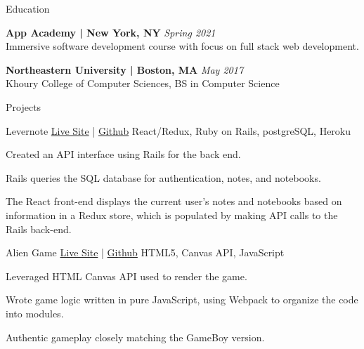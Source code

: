 \documentclass{resume}
\begin{document}
\begin{rSection}{Education}

    {\bf App Academy | New York, NY} \hfill{\em Spring 2021}
    \\ Immersive software development course with focus on full stack web development.

        {\bf Northeastern University | Boston, MA} \hfill{\em May 2017}
    \\ Khoury College of Computer Sciences, BS in Computer Science

\end{rSection}

\begin{rSection}{Projects}
    \begin{rSubsection}{Levernote}
        {\href{https://levernote.herokuapp.com/}{Live Site} |
            \href{https://github.com/philowe94/levernote}{Github}}
        {React/Redux, Ruby on Rails, postgreSQL, Heroku}{}
        \item Created an API interface using Rails for the back end.
        \item Rails queries the SQL database for authentication, notes, and notebooks.
        \item The React front-end displays the current user’s notes and notebooks based on information in a Redux store, which is populated by making API calls to the Rails back-end.
    \end{rSubsection}


    \begin{rSubsection}{Alien Game}
        {\href{https://philowe94.github.io/alien-game/}{Live Site} |
            \href{https://github.com/philowe94/alien-game}{Github}}
        {HTML5, Canvas API, JavaScript}{}
        \item Leveraged HTML Canvas API used to render the game.
        \item Wrote game logic written in pure JavaScript, using Webpack to organize the code into modules.
        \item Authentic gameplay closely matching the GameBoy version.
    \end{rSubsection}

\end{rSection}
\end{document}

